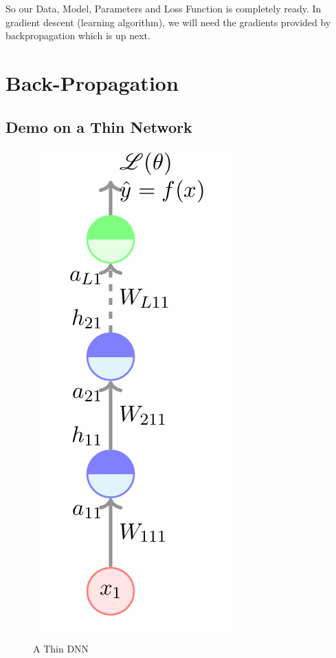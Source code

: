 \documentclass[11pt, a4paper]{article}
\begin{document}
So our Data, Model, Parameters and Loss Function is completely ready. In gradient descent (learning algorithm), we will need the gradients provided by backpropagation which is up next.


\section{Back-Propagation}

\subsection{Demo on a Thin Network}

\begin{figure}
    \centering
    \includegraphics[scale = 0.6]{image_2.png}
    \caption{A Thin DNN}
    \label{fig:2}
\end{figure}
\end{document}
